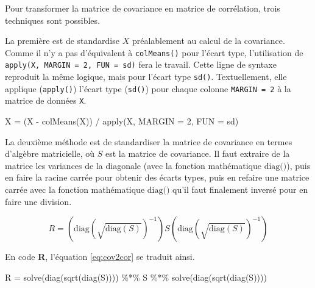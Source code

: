 \documentclass[
]{book}
\newenvironment{Shaded}{}{}
\newcommand{\AttributeTok}[1]{#1}
\newcommand{\DecValTok}[1]{#1}
\newcommand{\FunctionTok}[1]{#1}
\newcommand{\NormalTok}[1]{#1}
\newcommand{\OtherTok}[1]{#1}
\newcommand{\SpecialCharTok}[1]{#1}
\begin{document}
Pour transformer la matrice de covariance en matrice de corrélation, trois techniques sont possibles.

La première est de standardise \(X\) préalablement au calcul de la covariance. Comme il n'y a pas d'équivalent à \texttt{colMeans()} pour l'écart type, l'utilisation de \texttt{apply(X,\ MARGIN\ =\ 2,\ FUN\ =\ sd)} fera le travail. Cette ligne de syntaxe reproduit la même logique, mais pour l'écart type \texttt{sd()}. Textuellement, elle applique (\texttt{apply()}) l'écart type (\texttt{sd()}) pour chaque colonne \texttt{MARGIN\ =\ 2} à la matrice de données \texttt{X}.

\begin{Shaded}
\begin{Highlighting}[]
\NormalTok{X }\OtherTok{=}\NormalTok{ (X }\SpecialCharTok{{-}} \FunctionTok{colMeans}\NormalTok{(X)) }\SpecialCharTok{/} \FunctionTok{apply}\NormalTok{(X, }\AttributeTok{MARGIN =} \DecValTok{2}\NormalTok{, }\AttributeTok{FUN =}\NormalTok{ sd)}
\end{Highlighting}
\end{Shaded}

La deuxième méthode est de standardiser la matrice de covariance en termes d'algèbre matricielle, où \(S\) est la matrice de covariance. Il faut extraire de la matrice les variances de la diagonale (avec la fonction mathématique \(\text{diag()}\)), puis en faire la racine carrée pour obtenir des écarts types, puis en refaire une matrice carrée avec la fonction mathématique \(\text{diag()}\) qu'il faut finalement inversé pour en faire une division.

\begin{equation}
R = (\text{diag}(\sqrt{\text{diag}(S)})^{-1}) S (\text{diag}(\sqrt{\text{diag}(S)})^{-1})
\label{eq:cov2cor}
\end{equation}

En code \textbf{R}, l'équation \eqref{eq:cov2cor} se traduit ainsi.

\begin{Shaded}
\begin{Highlighting}[]
\NormalTok{R }\OtherTok{=} \FunctionTok{solve}\NormalTok{(}\FunctionTok{diag}\NormalTok{(}\FunctionTok{sqrt}\NormalTok{(}\FunctionTok{diag}\NormalTok{(S)))) }\SpecialCharTok{\%*\%}\NormalTok{ S }\SpecialCharTok{\%*\%} \FunctionTok{solve}\NormalTok{(}\FunctionTok{diag}\NormalTok{(}\FunctionTok{sqrt}\NormalTok{(}\FunctionTok{diag}\NormalTok{(S))))}
\end{Highlighting}
\end{Shaded}
\end{document}

